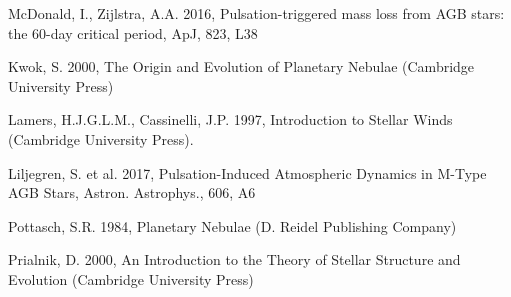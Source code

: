 \documentclass[a4paper,11pt,twocolumn]{article}
\begin{document}
\begin{thebibliography}{9}

    McDonald, I., Zijlstra, A.A. 2016, Pulsation-triggered mass loss from AGB stars: the 60-day critical period, ApJ, 823, L38 




    Kwok, S. 2000, The Origin and Evolution of Planetary Nebulae (Cambridge University Press)


    Lamers, H.J.G.L.M., Cassinelli, J.P. 1997, Introduction to Stellar Winds (Cambridge University Press). 

    Liljegren, S. et al. 2017, Pulsation-Induced Atmospheric Dynamics in M-Type AGB Stars, Astron. Astrophys., 606, A6 


    Pottasch, S.R. 1984, Planetary Nebulae (D. Reidel Publishing Company)

    Prialnik, D. 2000, An Introduction to the Theory of Stellar Structure and Evolution (Cambridge University Press)


\end{thebibliography}
\end{document}

